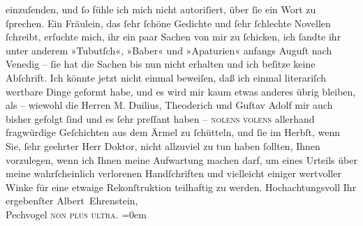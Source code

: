 \begin{ledgroupsized}[t]{13cm}
                    einzuſenden, und ſo fühle ich mich nicht autoriſiert, über ſie ein Wort zu
                    ſprechen. Ein Fräulein,
                    das ſehr ſchöne Gedichte und ſehr ſchlechte Novellen ſchreibt, erſuchte mich,
                    ihr ein paar Sachen von mir {\pb}zu ſchicken, ich ſandte
                    ihr unter anderem »Tubutſch«, »Baber« und »Apaturien« anfangs Auguſt nach Venedig – ſie hat die Sachen bis nun nicht erhalten und
                    ich beſitze keine Abſchrift. Ich könnte jetzt nicht einmal beweiſen, daß ich
                    einmal literariſch wertbare Dinge geformt habe, und es wird mir kaum etwas
                    anderes übrig bleiben, als – wiewohl die Herren M.
                        Duilius, Theoderich und Guſtav Adolf mir auch bisher gefolgt ſind und
                    es ſehr {\pb}preſſant haben – \textsc{nolens
                        volens} allerhand fragwürdige Geſchichten aus dem Ärmel zu ſchütteln,
                    und ſie im Herbſt, wenn Sie, ſehr geehrter Herr Doktor, nicht allzuviel zu tun
                    haben ſollten, Ihnen vorzulegen, wenn ich Ihnen meine Aufwartung machen darf, um
                    eines Urteils über meine wahrſcheinlich verlorenen Handſchriften und vielleicht
                    einiger wertvoller Winke für eine etwaige Rekonſtruktion teilhaftig zu werden.
                    Hochachtungsvoll Ihr ergebenſter\pend
           \pstart
           \spacefill\mbox{Albert Ehrenstein,}{\\[\baselineskip]}Pechvogel \textsc{non plus ultra.}\pend
           \leftskip=0em{}\endnumbering{}\end{ledgroupsized}  \newcommand{\dateiname}{L01867}\newcommand{\titel}{Albert Ehrenstein an Arthur Schnitzler, 24. 8. 1909}\newcommand{\editorInnen}{Martin Anton Müller und Gerd-Hermann Susen}
      
